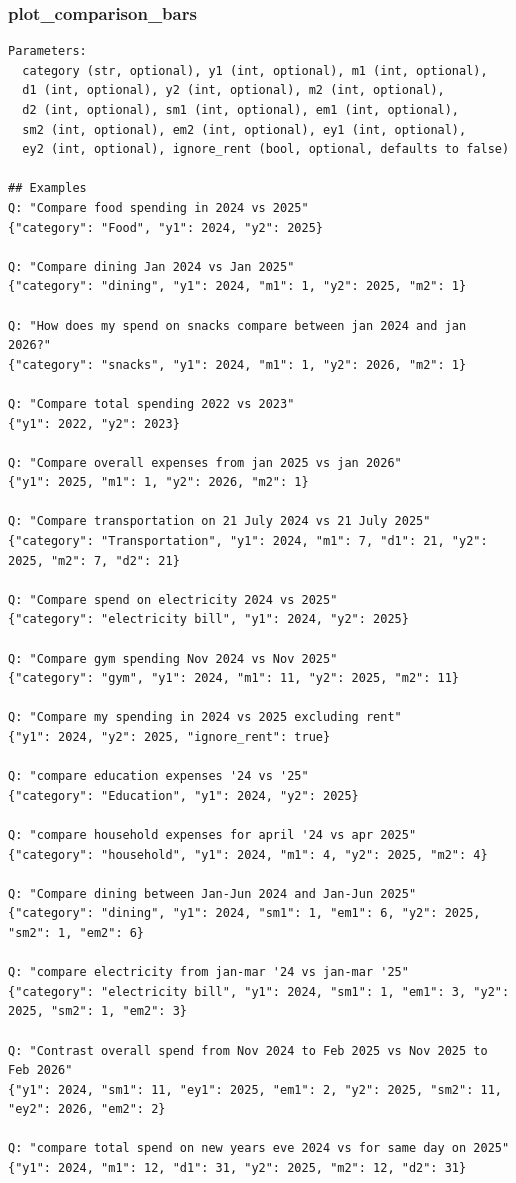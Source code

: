 \documentclass[11pt,twocolumn]{article}
\begin{document}
\subsubsection{plot\_comparison\_bars}
\begin{scriptsize}
\begin{verbatim}
Parameters:
  category (str, optional), y1 (int, optional), m1 (int, optional),
  d1 (int, optional), y2 (int, optional), m2 (int, optional),
  d2 (int, optional), sm1 (int, optional), em1 (int, optional),
  sm2 (int, optional), em2 (int, optional), ey1 (int, optional),
  ey2 (int, optional), ignore_rent (bool, optional, defaults to false)

## Examples
Q: "Compare food spending in 2024 vs 2025"
{"category": "Food", "y1": 2024, "y2": 2025}

Q: "Compare dining Jan 2024 vs Jan 2025"
{"category": "dining", "y1": 2024, "m1": 1, "y2": 2025, "m2": 1}

Q: "How does my spend on snacks compare between jan 2024 and jan 2026?"
{"category": "snacks", "y1": 2024, "m1": 1, "y2": 2026, "m2": 1}

Q: "Compare total spending 2022 vs 2023"
{"y1": 2022, "y2": 2023}

Q: "Compare overall expenses from jan 2025 vs jan 2026"
{"y1": 2025, "m1": 1, "y2": 2026, "m2": 1}

Q: "Compare transportation on 21 July 2024 vs 21 July 2025"
{"category": "Transportation", "y1": 2024, "m1": 7, "d1": 21, "y2": 2025, "m2": 7, "d2": 21}

Q: "Compare spend on electricity 2024 vs 2025"
{"category": "electricity bill", "y1": 2024, "y2": 2025}

Q: "Compare gym spending Nov 2024 vs Nov 2025"
{"category": "gym", "y1": 2024, "m1": 11, "y2": 2025, "m2": 11}

Q: "Compare my spending in 2024 vs 2025 excluding rent"
{"y1": 2024, "y2": 2025, "ignore_rent": true}

Q: "compare education expenses '24 vs '25"
{"category": "Education", "y1": 2024, "y2": 2025}

Q: "compare household expenses for april '24 vs apr 2025"
{"category": "household", "y1": 2024, "m1": 4, "y2": 2025, "m2": 4}

Q: "Compare dining between Jan-Jun 2024 and Jan-Jun 2025"
{"category": "dining", "y1": 2024, "sm1": 1, "em1": 6, "y2": 2025, "sm2": 1, "em2": 6}

Q: "compare electricity from jan-mar '24 vs jan-mar '25"
{"category": "electricity bill", "y1": 2024, "sm1": 1, "em1": 3, "y2": 2025, "sm2": 1, "em2": 3}

Q: "Contrast overall spend from Nov 2024 to Feb 2025 vs Nov 2025 to Feb 2026"
{"y1": 2024, "sm1": 11, "ey1": 2025, "em1": 2, "y2": 2025, "sm2": 11, "ey2": 2026, "em2": 2}

Q: "compare total spend on new years eve 2024 vs for same day on 2025"
{"y1": 2024, "m1": 12, "d1": 31, "y2": 2025, "m2": 12, "d2": 31}
\end{verbatim}
\end{scriptsize}
\end{document}
